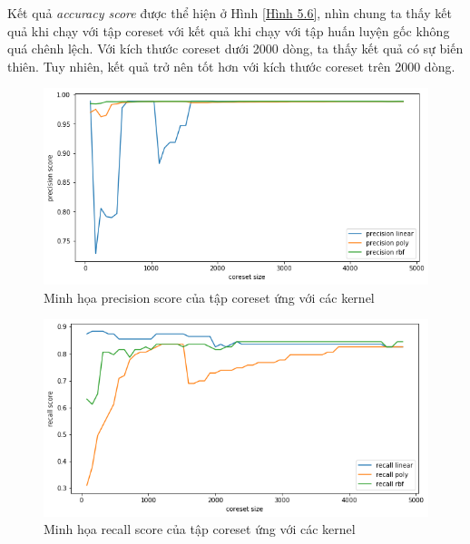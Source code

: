 \documentclass[a4paper, 12pt, oneside]{report}
\begin{document}
Kết quả \textit{accuracy score} được thể hiện ở Hình \ref{Hình 5.6}, nhìn chung ta thấy kết quả khi chạy với tập coreset với kết quả khi chạy với tập huấn luyện gốc không quá chênh lệch. Với kích thước coreset dưới 2000 dòng, ta thấy kết quả có sự biến thiên. Tuy nhiên, kết quả trở nên tốt hơn với kích thước coreset trên 2000 dòng. 
\begin{center}
    \begin{figure}[H]
    \begin{center}
     \includegraphics[scale=0.4]{precision_creditcard_Fraud.png}
    \end{center}
     \caption{Minh họa precision score của tập coreset ứng với các kernel}
    \label{Hình 5.7}
    \end{figure}
\end{center}
\begin{center}
    \begin{figure}[H]
    \begin{center}
     \includegraphics[scale=0.4]{recall_creditcard_Fraud.png}
    \end{center}
     \caption{ Minh họa recall score của tập coreset ứng với các kernel}
    \label{Hình 5.8}
    \end{figure}
\end{center}
\end{document}
